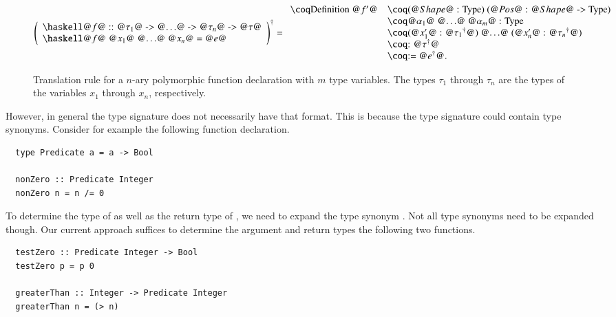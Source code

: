 \begin{figure}[H]
  \[
    \toCoq{\left(
      \begin{array}{l}
        \haskellM{@$f$@ :: @$\tau_1$@ -> @$\ldots$@ -> @$\tau_n$@ -> @$\tau$@} \\
        \haskellM{@$f$@ @$x_1$@ @$\ldots$@ @$x_n$@ = @$e$@}
      \end{array}
    \right)}
    = \begin{array}{ll}
        \coqM{Definition @$f'$@}
          &\coqM{(@$\Shape$@ : Type) (@$\Pos$@ : @$\Shape$@ -> Type)}     \\
          &\coqM{{@$\alpha_1$@ @$\ldots$@ @$\alpha_m$@ : Type}}           \\
          &\coqM{(@$x_1'$@ : @$\toCoqX{\tau_1}$@) @$\ldots$@ (@$x_n'$@ : @$\toCoqX{\tau_n}$@)}                                           \\
          &\coqM{: @$\toCoqX{\tau}$@}                                     \\
          &\coqM{:= @$\toCoqX{e}$@.}                                      \\
      \end{array}
  \]
  \caption{
    Translation rule for a $n$-ary polymorphic function declaration with $m$ type variables.
    The types $\tau_1$ through $\tau_n$ are the types of the variables $x_1$ through $x_n$, respectively.
  }
  \label{fig:translation:func-decl:non-rec}
\end{figure}

However, in general the type signature does not necessarily have that format.
This is because the type signature could contain type synonyms.
Consider for example the following function declaration.
\begin{verbatim}
  type Predicate a = a -> Bool

  nonZero :: Predicate Integer
  nonZero n = n /= 0
\end{verbatim}
To determine the type of  as well as the return type of , we need to expand the type synonym .
Not all type synonyms need to be expanded though.
Our current approach suffices to determine the argument and return types the following two functions.
\begin{verbatim}
  testZero :: Predicate Integer -> Bool
  testZero p = p 0

  greaterThan :: Integer -> Predicate Integer
  greaterThan n = (> n)
\end{verbatim}

